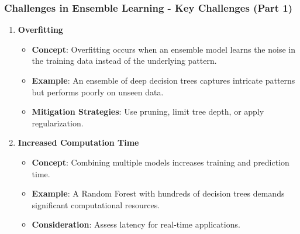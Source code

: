 \documentclass[aspectratio=169]{beamer}
\begin{document}
\begin{frame}[fragile]
    \frametitle{Challenges in Ensemble Learning - Key Challenges (Part 1)}
    \begin{enumerate}
        \item \textbf{Overfitting}
            \begin{itemize}
                \item \textbf{Concept}: Overfitting occurs when an ensemble model learns the noise in the training data instead of the underlying pattern.
                \item \textbf{Example}: An ensemble of deep decision trees captures intricate patterns but performs poorly on unseen data.
                \item \textbf{Mitigation Strategies}: Use pruning, limit tree depth, or apply regularization.
            \end{itemize}
        
        \item \textbf{Increased Computation Time}
            \begin{itemize}
                \item \textbf{Concept}: Combining multiple models increases training and prediction time.
                \item \textbf{Example}: A Random Forest with hundreds of decision trees demands significant computational resources.
                \item \textbf{Consideration}: Assess latency for real-time applications.
            \end{itemize}
    \end{enumerate}
\end{frame}
\end{document}

